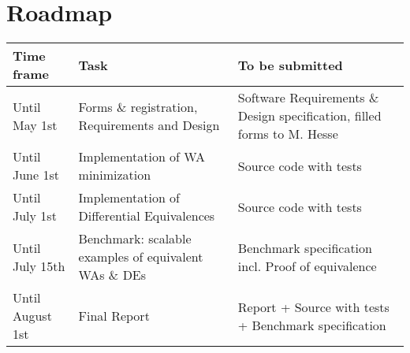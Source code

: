 \documentclass[11pt, rgb]{scrartcl}
\begin{document}
\section{Roadmap}
\centering
\begin{tabular}{l  p{6.3cm}  p{6.3cm}} \toprule
 Time frame & Task & To be submitted\\ \midrule
 Until May 1st & Forms \& registration, Requirements and Design & Software Requirements \& Design specification, filled forms to M. Hesse\\ \hline
 Until June 1st & Implementation of WA minimization & Source code with tests \\ \hline
 Until July 1st & Implementation of Differential Equivalences & Source code with tests \\ \hline
 Until July 15th & Benchmark: scalable examples of equivalent WAs \& DEs & Benchmark specification incl. Proof of equivalence \\ \hline
 Until August 1st & Final Report & Report + Source with tests + Benchmark specification \\ \bottomrule
\end{tabular}
\end{document}
